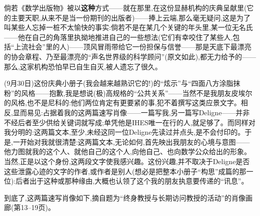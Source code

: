 倘若《数学出版物》被以\textbf{这种}方式——就在那里,在这份显赫机构的庆典呈献里(它的主要天职,从来不是当一份期刊的出版者)——捧上云端,那么毫无疑问,这是为了叫某些人忘掉一桩不太愉快的事实:倘若不是在某几个关键的年头里,某一位无名氏——他在自己的角落里执拗地推进自己的一些想法(它们有幸咬住了某些人,包括“上流社会”里的人)——顶风冒雨带给它一份担保与信誉——那是天底下最漂亮的协会章程、乃至最漂亮的“声名世界级的科学顾问”(原文如此),\dmark{}都无力给予的——那么,这家机构恐怕早已自生自灭,被人遗忘了很久。

(9月30日)这份庆典小册子(我会越来越熟识它的!)的“炫示”与“四面八方涂脂抹粉”的风格——抱歉,我是想说(极)高规格的“公共关系”——当然不是我朋友皮埃尔的风格,也不是尼科的:他们两位肯定有更要紧的事,犯不着撰写这类应景文字。相反,显而易见:占据着我的这两篇速写肖像——一篇写我,另一篇写Deligne——并非不经后者至少供给关键词就写成;单凭他是IHES唯一在行的人,就足够了。而同样对我分明的:这两篇文本,至少,未经这同一位Deligne先读过并点头,是不会付印的。于是,一开始对我就很清楚:这两篇文本,无论如何,首先映出我朋友的心境与意图——他力图就我的这个人、就他自己的这个人,向他自己、也向数学公众给出的形象。当然,正是以这个身份,这两段文字使我感兴趣。这份兴趣,并不取决于Deligne是否这些泄露心迹的文字的作者,或作者是别人(想必是把整本小册子“构思”成篇的那一位):后者出于这种或那种缘由,大概也认领了这个我的朋友执意要传递的“讯息”。

到底了,这两篇速写肖像如下,摘自题为“终身教授与长期访问教授的活动”的肖像画廊(第13--19页)。

